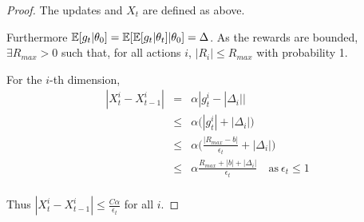 \begin{proof}
    The updates and $X_t$ are defined as above. 
    
    Furthermore $\mathbb{E}[g_t|\theta_0] = \mathbb{E}[\mathbb{E}[g_t | \theta_t] | \theta_0] = \Delta $.
    As the rewards are bounded, $\exists R_{max}>0$ such that, for all actions $i$, $|R_i| \le R_{max}$ with probability 1. 
    
    For the $i$-th dimension,
    \begin{eqnarray*}
    |X_t^i - X_{t-1}^i| &=& \alpha |g_t^i - |\Delta_i| |\\
    &\le& \alpha\big(| g_t^i| + |\Delta_i| \big)\\
     &\le& \alpha\big( \frac{|R_{max}-b|}{\epsilon_t} + |\Delta_i| \big) \\
    &\le& \alpha \frac{R_{max} + |b| + |\Delta_i| }{\epsilon_t} \quad \text{as}\ \epsilon_t \le 1\\
    \end{eqnarray*}
    
    Thus   $|X_t^i - X_{t-1}^i| \le \frac{C \alpha}{\epsilon_t}$ for all $i$.
\end{proof}






